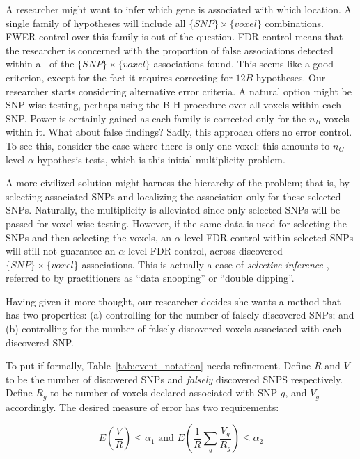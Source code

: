 \documentclass[review,12pt]{article}
\begin{document}
A researcher might want to infer which gene is associated with which location.
A single family of hypotheses will include all $\{SNP\} \times \{voxel\}$ combinations. 
FWER control over this family is out of the question. 
FDR control means that the researcher is concerned with the proportion of false associations detected within all of the $\{SNP\} \times \{voxel\}$ associations found. This seems like a good criterion, except for the fact it requires correcting for $12B$ hypotheses. 
Our researcher starts considering alternative error criteria. 
A natural option might be SNP-wise testing, perhaps using the B-H procedure over all voxels within each SNP. Power is certainly gained as each family is corrected only for the $n_B$ voxels within it. 
What about false findings? Sadly, this approach offers no error control. To see this, consider the case where there is only one voxel: this amounts to $n_G$ level $\alpha$ hypothesis tests, which is this initial multiplicity problem. 

A more civilized solution might harness the hierarchy of the problem; that is, by selecting associated SNPs and localizing the association only for these selected SNPs. 
Naturally, the multiplicity is alleviated since only selected SNPs will be passed for voxel-wise testing. However, if the same data is used for selecting the SNPs and then selecting the voxels, an $\alpha$ level FDR control within selected SNPs will still not guarantee an $\alpha$ level FDR control, across discovered $\{SNP\} \times \{voxel\}$ associations. This is actually a case of \emph{selective inference} \citep{benjamini_simultaneous_2010}, referred to by practitioners as ``data snooping'' or ``double dipping''. 

Having given it more thought, our researcher decides she wants a method that has two properties: 
(a) controlling for the number of falsely discovered SNPs; and 
(b) controlling for the number of falsely discovered voxels associated with each discovered SNP. 

To put if formally, Table~\ref{tab:event_notation} needs refinement. 
Define $R$ and $V$ to be the number of discovered SNPs and \emph{falsely} discovered SNPS respectively. 
Define $R_g$ to be number of voxels declared associated with SNP $g$, and $V_g$ accordingly. The desired measure of error has two requirements: 

\begin{equation} \label{eq:hirarchial_error}
 E \left(\frac{V}{R} \right)\leq \alpha_1 
\text{ and } 
E \left( \frac{1}{R}\sum_{g} \frac{V_{g}}{R_{g}} \right)\leq \alpha_2
\end{equation}
\end{document}
